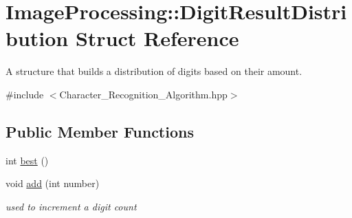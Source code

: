 \hypertarget{struct_image_processing_1_1_digit_result_distribution}{}\section{Image\+Processing\+:\+:Digit\+Result\+Distribution Struct Reference}
\label{struct_image_processing_1_1_digit_result_distribution}


A structure that builds a distribution of digits based on their amount.  




{\ttfamily \#include $<$Character\+\_\+\+Recognition\+\_\+\+Algorithm.\+hpp$>$}

\subsection*{Public Member Functions}
\begin{DoxyCompactItemize}
\item 
int \mbox{\hyperlink{struct_image_processing_1_1_digit_result_distribution_a93d3216aa066401d9c1c0ed25bd618d6}{best}} ()
\item 
\mbox{\label{struct_image_processing_1_1_digit_result_distribution_aa845a0f9ab06af9741509ddcc40161bc}} 
void \mbox{\hyperlink{struct_image_processing_1_1_digit_result_distribution_aa845a0f9ab06af9741509ddcc40161bc}{add}} (int number)
\begin{DoxyCompactList}\small\item\em used to increment a digit count \end{DoxyCompactList}\end{DoxyCompactItemize}
